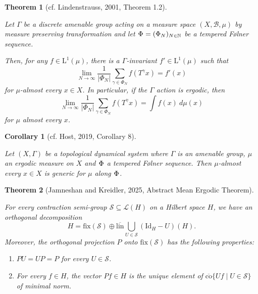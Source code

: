 \documentclass[
  british,
]{article}
\providecommand{\tightlist}{%
  \setlength{\itemsep}{0pt}\setlength{\parskip}{0pt}}
\theoremstyle{plain}
\newtheorem{corollary}{Corollary}[section]
\theoremstyle{plain}
\newtheorem{theorem}{Theorem}[section]
\theoremstyle{remark}
\newcommand{\AmenableGroup}{{\Gamma}}
\newcommand{\AmenableGroupElement}{{\gamma}}
\newcommand{\CountingMeasure}[1]{{\left|#1\right|}}
\newcommand{\Folner}[1][\vphantom{}]{{\Phi}_{#1}}
\newcommand{\GroupAction}[2]{T^{#1}{#2}}
\newcommand{\Measure}{{\mu}}
\newcommand{\SigmaAlgebra}[1]{{\mathscr{#1}}}
\begin{document}
\begin{theorem}[{cf. Lindenstrauss, 2001, Theorem
1.2}]\protect\hypertarget{thm-GeneralisedPET}{}\label{thm-GeneralisedPET}

Let \(\AmenableGroup\) be a discrete amenable group acting on a measure
space \((X,\SigmaAlgebra{B},\Measure)\) by measure preserving
transformation and let \(\Folner=(\Folner[N])_{N\in\mathbb{N}}\) be a
tempered Følner sequence.

Then, for any \(f\in\text{L}^1(\Measure)\), there is a
\(\AmenableGroup\)-invariant \(f'\in\text{L}^1(\Measure)\) such that
\[\lim_{N\rightarrow\infty}\frac{1}{\CountingMeasure{\Folner[N]}}\sum_{\AmenableGroupElement\in\Folner[N]}f(\GroupAction{\AmenableGroupElement}{x})=f'(x) \]
for \(\Measure\)-almost every \(x\in X\). In particular, if the
\(\AmenableGroup\) action is ergodic, then
\[\lim_{N\rightarrow\infty}\frac{1}{\CountingMeasure{\Folner[N]}}\sum_{\AmenableGroupElement\in\Folner[N]}f(\GroupAction{\AmenableGroupElement}{x})=\int f(x)\ d\Measure(x) \]
for \(\Measure\) almost every \(x\).

\end{theorem}

\begin{corollary}[{cf. Host, 2019, Corollary
8}]\protect\hypertarget{cor-temperedGeneric}{}\label{cor-temperedGeneric}

Let \((X,\AmenableGroup)\) be a topological dynamical system where
\(\AmenableGroup\) is an amenable group, \(\Measure\) an ergodic measure
on \(X\) and \(\Folner\) a tempered Følner sequence. Then
\(\Measure\)-almost every \(x\in X\) is generic for \(\Measure\) along
\(\Folner\).

\end{corollary}

\begin{theorem}[{Jamneshan and Kreidler, 2025, Abstract Mean Ergodic
Theorem}]\protect\hypertarget{thm-AbstractMeanErgodic}{}\label{thm-AbstractMeanErgodic}

For every contraction semi-group \(\mathscr{S}\subseteq\mathscr{L}(H)\)
on a Hilbert space \(H\), we have an orthogonal decomposition
\[H=\text{fix}(\mathscr{S})\oplus\overline{\text{lin}}\bigcup_{U\in\mathscr{S}}(\text{Id}_H-U)(H).\]
Moreover, the orthogonal projection \(P\) onto
\(\text{fix}(\mathscr{S})\) has the following properties:

\begin{enumerate}
\def\labelenumi{\arabic{enumi}.}
\tightlist
\item
  \(PU=UP=P\) for every \(U\in\mathscr{S}\).
\item
  For every \(f\in H\), the vector \(Pf\in H\) is the unique element of
  \(\overline{\text{co}}\{Uf\mid U\in\mathscr{S}\}\) of minimal norm.
\end{enumerate}

\end{theorem}
\end{document}
